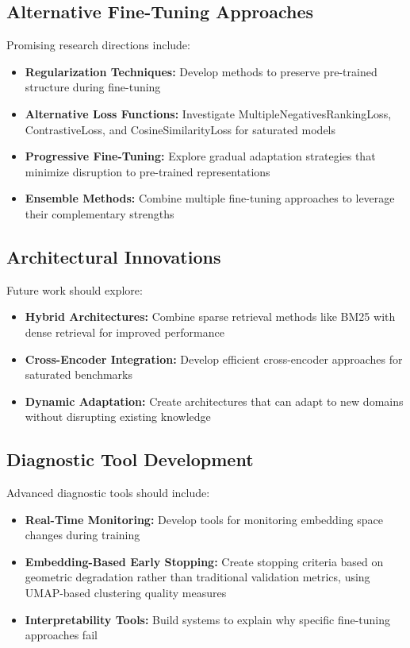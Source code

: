 \subsection{Alternative Fine-Tuning Approaches}

Promising research directions include:

\begin{itemize}
\item \textbf{Regularization Techniques:} Develop methods to preserve pre-trained structure during fine-tuning
\item \textbf{Alternative Loss Functions:} Investigate MultipleNegativesRankingLoss, ContrastiveLoss, and CosineSimilarityLoss \cite{sbert_losses} for saturated models
\item \textbf{Progressive Fine-Tuning:} Explore gradual adaptation strategies that minimize disruption to pre-trained representations
\item \textbf{Ensemble Methods:} Combine multiple fine-tuning approaches to leverage their complementary strengths
\end{itemize}

\subsection{Architectural Innovations}

Future work should explore:

\begin{itemize}
\item \textbf{Hybrid Architectures:} Combine sparse retrieval methods like BM25 with dense retrieval for improved performance
\item \textbf{Cross-Encoder Integration:} Develop efficient cross-encoder approaches for saturated benchmarks
\item \textbf{Dynamic Adaptation:} Create architectures that can adapt to new domains without disrupting existing knowledge
\end{itemize}

\subsection{Diagnostic Tool Development}

Advanced diagnostic tools should include:

\begin{itemize}
\item \textbf{Real-Time Monitoring:} Develop tools for monitoring embedding space changes during training
\item \textbf{Embedding-Based Early Stopping:} Create stopping criteria based on geometric degradation rather than traditional validation metrics, using UMAP-based clustering quality measures
\item \textbf{Interpretability Tools:} Build systems to explain why specific fine-tuning approaches fail
\end{itemize}


